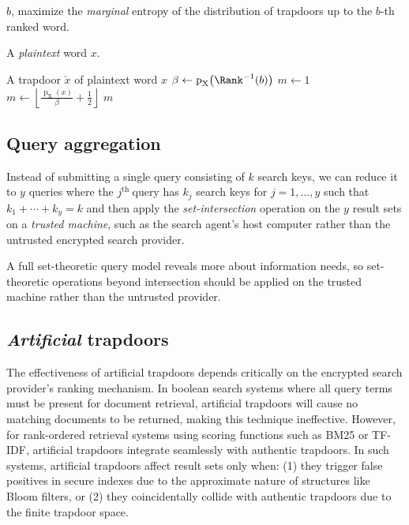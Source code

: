 \documentclass[final,11pt]{article}
\newcommand{\rv}[1]{\mathrm{#1}}
\newcommand{\pmf}{\operatorname{p}}
\newcommand{\jth}{$j^{\text{th }}$}
\numberwithin{equation}{section}
\theoremstyle{plain}
\theoremstyle{remark}
\begin{document}
\begin{algorithm}
    \caption{Homophonic substitution cipher}
    \label{alg:homphon_sub}
    \parameters
    {
        $b$, maximize the \emph{marginal} entropy of the distribution of trapdoors up to the $b$-th ranked word.
    }
    \KwIn
    {
        A \emph{plaintext} word $x$.

    }
    \KwOut
    {
        A trapdoor $\check{x}$ of plaintext word $x$\;
    }
    {
        $\beta \gets \pmf_{\rv{X}}\!\left(\Rank^{-1}(b)\right)$\;
        $m \gets 1$\;
        {
            $m \gets \left\lfloor
                \frac
                {
                    \pmf_{\rv{X}}(x)
                }
                {
                    \beta
                } + \frac{1}{2}
            \right\rfloor$\;
        }
        \Return $m$\;
    }
\end{algorithm}

\subsection{Query aggregation}
Instead of submitting a single query consisting of $k$ search keys, we can reduce it to $y$ queries where the \jth query has $k_j$ search keys for $j=1,\ldots,y$ such that $k_1 + \cdots + k_y = k$ and then apply the \emph{set-intersection} operation on the $y$ result sets on a \emph{trusted machine}, such as the search agent's host computer rather than the untrusted encrypted search provider.

A full set-theoretic query model\cite{manning2008introduction} reveals more about information needs, so set-theoretic operations beyond intersection should be applied on the trusted machine rather than the untrusted provider.

\subsection{\emph{Artificial} trapdoors}
The effectiveness of artificial trapdoors depends critically on the encrypted search provider's ranking mechanism. In boolean search systems where all query terms must be present for document retrieval, artificial trapdoors will cause no matching documents to be returned, making this technique ineffective. However, for rank-ordered retrieval systems using scoring functions such as BM25 or TF-IDF, artificial trapdoors integrate seamlessly with authentic trapdoors. In such systems, artificial trapdoors affect result sets only when: (1) they trigger false positives in secure indexes due to the approximate nature of structures like Bloom filters, or (2) they coincidentally collide with authentic trapdoors due to the finite trapdoor space.
\end{document}
